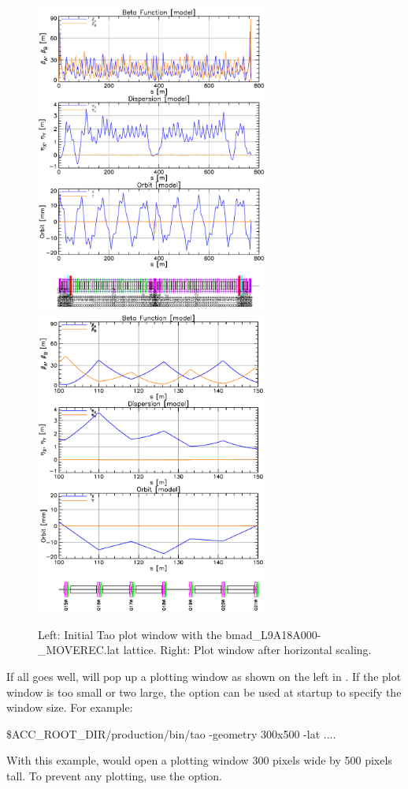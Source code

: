 \documentclass{report}
\begin{document}
\begin{figure}[t]
\begin{centering}
\includegraphics[width=3in]{tao-start.pdf}
\hfill
\includegraphics[width=3in]{tao-x-scale.pdf}
\caption{Left: Initial Tao plot window with the bmad_L9A18A000-_MOVEREC.lat lattice.
Right: Plot window after horizontal scaling.}
\label{f:tao-start}
\end{centering}
\end{figure}

If all goes well,  will pop up a plotting window as shown on the left in
. If the plot window is too small or two large, the  option
can be used at startup to specify the window size. For example:
\begin{example}
  \$ACC_ROOT_DIR/production/bin/tao -geometry 300x500 -lat ....
\end{example}
With this example,  would open a plotting window 300 pixels wide by 500 pixels tall.
To prevent any plotting, use the  option.
\end{document}

